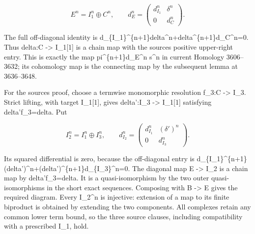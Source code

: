 \[
 E^n=I_1^n\oplus C^n,\qquad
 d_E^n=\begin{pmatrix}d_{I_1}^n&\delta^n\\0&d_C^n\end{pmatrix}.
                                                               \tag{6.2}
\]

The full off-diagonal identity is d\_\allowbreak{}\{I\_\allowbreak{}1\}\textasciicircum{}\{n\allowbreak{}+1\}delta\textasciicircum{}n\allowbreak{}+delta\textasciicircum{}\{n\allowbreak{}+1\}d\_\allowbreak{}C\textasciicircum{}n\allowbreak{}=0. Thus delta:\allowbreak{}C \allowbreak{}-> I\_\allowbreak{}1[1]\allowbreak{} is a chain map with the source\textquotesingle s positive upper-right entry. This is exactly the map pi\textasciicircum{}\{n\allowbreak{}+1\}d\_\allowbreak{}E\textasciicircum{}n s\^{}n in current Homology 3606–\allowbreak{}3632; its cohomology map is the connecting map by the subsequent lemma at 3636–\allowbreak{}3648.

For the source\textquotesingle s proof,\allowbreak{} choose a termwise monomorphic resolution f\_\allowbreak{}3:\allowbreak{}C \allowbreak{}-> I\_\allowbreak{}3. Strict lifting,\allowbreak{} with target I\_\allowbreak{}1[1]\allowbreak{},\allowbreak{} gives delta':\allowbreak{}I\_\allowbreak{}3 \allowbreak{}-> I\_\allowbreak{}1[1]\allowbreak{} satisfying delta'f\_\allowbreak{}3\allowbreak{}=delta. Put

\[
 I_2^n=I_1^n\oplus I_3^n,\qquad
 d_{I_2}^n=\begin{pmatrix}d_{I_1}^n&(\delta')^n\\0&d_{I_3}^n\end{pmatrix}.
                                                               \tag{6.3}
\]

Its squared differential is zero,\allowbreak{} because the off-diagonal entry is d\_\allowbreak{}\{I\_\allowbreak{}1\}\textasciicircum{}\{n\allowbreak{}+1\}(delta')\allowbreak{}\textasciicircum{}n\allowbreak{}+(delta')\allowbreak{}\textasciicircum{}\{n\allowbreak{}+1\}d\_\allowbreak{}\{I\_\allowbreak{}3\}\textasciicircum{}n\allowbreak{}=0. The diagonal map E \allowbreak{}-> I\_\allowbreak{}2 is a chain map by delta'f\_\allowbreak{}3\allowbreak{}=delta. It is a quasi-isomorphism by the two outer quasi-isomorphisms in the short exact sequences. Composing with B \allowbreak{}-> E gives the required diagram. Every I\_\allowbreak{}2\textasciicircum{}n is injective:\allowbreak{} extension of a map to its finite biproduct is obtained by extending the two components. All complexes retain any common lower term bound,\allowbreak{} so the three source clauses,\allowbreak{} including compatibility with a prescribed I\_\allowbreak{}1,\allowbreak{} hold.

